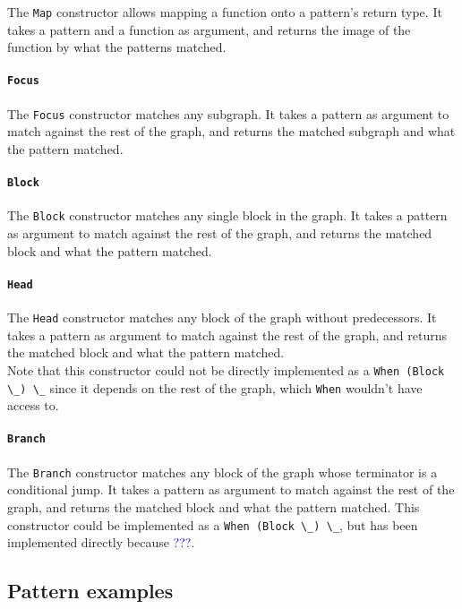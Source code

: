 \documentclass[11pt]{article}
\newcommand{\inlinecoq}[1]{\mbox{\lstinline[style=customcoq,columns=fixed,basewidth=.48em]{#1}}}
\newcommand{\ilc}[1]{\inlinecoq{#1}}
\newcommand{\leon}[1]{\textcolor{blue}{#1}}
\begin{document}
The \ilc{Map} constructor allows mapping a function onto a pattern's return type.
It takes a pattern and a function as argument, and returns the image of the function by what the patterns matched.

\paragraph{\ilc{Focus}}

The \ilc{Focus} constructor matches any subgraph.
It takes a pattern as argument to match against the rest of the graph, and returns the matched subgraph and what the pattern matched.

\paragraph{\ilc{Block}}

The \ilc{Block} constructor matches any single block in the graph.
It takes a pattern as argument to match against the rest of the graph, and returns the matched block and what the pattern matched.

\paragraph{\ilc{Head}}

The \ilc{Head} constructor matches any block of the graph without predecessors.
It takes a pattern as argument to match against the rest of the graph, and returns the matched block and what the pattern matched.\\
Note that this constructor could not be directly implemented as a \ilc{When (Block \_) \_} since it depends on the rest of the graph, which \ilc{When} wouldn't have access to.

\paragraph{\ilc{Branch}}

The \ilc{Branch} constructor matches any block of the graph whose terminator is a conditional jump.
It takes a pattern as argument to match against the rest of the graph, and returns the matched block and what the pattern matched.
This constructor could be implemented as a \ilc{When (Block \_) \_}, but has been implemented directly because \leon{???}.


\subsection*{Pattern examples}
\end{document}
